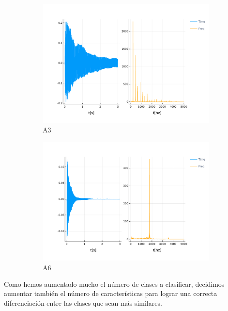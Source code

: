 \documentclass[12pt]{article}
\begin{document}
\begin{figure}[!ht]
	\centering
	\begin{subfigure}{.5\textwidth}
		\centering
		\includegraphics[width=1.0\linewidth]{assets/A3.pdf}
		\caption{A3}
		\label{fig:a3}
	\end{subfigure}%
	\begin{subfigure}{.5\textwidth}
		\centering
		\includegraphics[width=1.0\linewidth]{assets/A6.pdf}
		\caption{A6}
		\label{fig:a6}
	\end{subfigure}
	\caption{}
\end{figure}

\newpage
Como hemos aumentado mucho el número de clases a clasificar, decidimos aumentar también el número de características 
para lograr una correcta diferenciación entre las clases que sean más similares.
\end{document}
